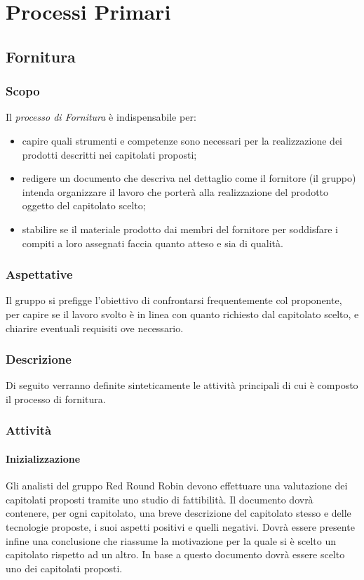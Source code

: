 \section{Processi Primari} 


\subsection{Fornitura}

	\subsubsection{Scopo}
	\text Il \textit{processo di Fornitura} è indispensabile per:
	\begin{itemize}
	\item capire quali strumenti e competenze sono necessari per la realizzazione dei prodotti descritti nei capitolati proposti;
	\item redigere un documento che descriva nel dettaglio come il fornitore (il gruppo) intenda organizzare il lavoro che porterà alla realizzazione del prodotto oggetto del capitolato scelto;
	\item stabilire se il materiale prodotto dai membri del fornitore per soddisfare i compiti a loro assegnati faccia quanto atteso e sia di qualità.    
	\end{itemize}
 	\subsubsection{Aspettative}
	Il gruppo si prefigge l'obiettivo di confrontarsi frequentemente col proponente, per capire se il lavoro svolto è in linea con quanto richiesto dal capitolato scelto, e chiarire eventuali requisiti ove necessario.
	\subsubsection{Descrizione}
	Di seguito verranno definite sinteticamente le attività principali di cui è composto il processo di fornitura. 
	\subsubsection{Attività}
		
		\paragraph{Inizializzazione}
			Gli analisti del gruppo Red Round Robin devono effettuare una valutazione dei capitolati proposti tramite uno studio di fattibilità. 
			 Il documento dovrà contenere, per ogni capitolato, una breve descrizione del capitolato stesso e delle tecnologie proposte, i suoi aspetti positivi e quelli negativi. Dovrà essere presente infine una conclusione che riassume la motivazione per la quale si è scelto un capitolato rispetto ad un altro. 
			In base a questo documento dovrà essere scelto uno dei capitolati proposti.
